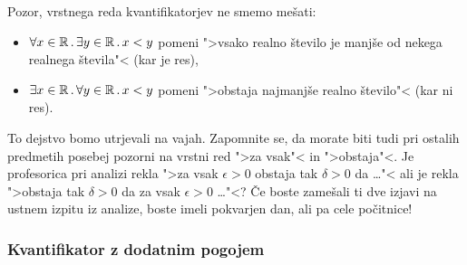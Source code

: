 Pozor, vrstnega reda kvantifikatorjev ne smemo mešati:
%
\begin{itemize}
\item $\forall x \in \mathbb{R} \,.\, \exists y \in \mathbb{R} \,.\, x < y$ pomeni ">vsako realno število je manjše od nekega realnega števila"< (kar je res),
\item $\exists x \in \mathbb{R} \,.\, \forall y \in \mathbb{R} \,.\, x < y$ pomeni ">obstaja najmanjše realno število"< (kar ni res).
\end{itemize}
%
To dejstvo bomo utrjevali na vajah. Zapomnite se, da morate biti tudi pri ostalih predmetih posebej pozorni na vrstni red
">za vsak"< in ">obstaja"<. Je profesorica pri analizi rekla ">za vsak $\epsilon > 0$ obstaja tak $\delta > 0$ da \dots"< ali je rekla ">obstaja tak $\delta > 0$ da za vsak $\epsilon > 0$ \dots"<? Če boste zamešali ti dve izjavi na ustnem izpitu iz analize, boste imeli pokvarjen dan, ali pa cele počitnice!


\subsubsection{Kvantifikator z dodatnim pogojem}

